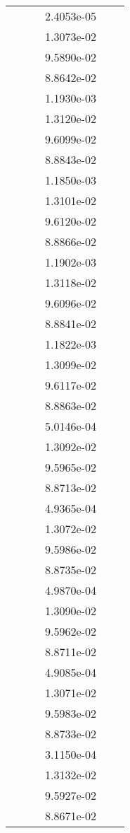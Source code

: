 \begin{xltabular}{\textwidth}{r|rS[table-format=1.3e+2]S[table-format=1.4e+2]S[table-format=1.4e+2]S[table-format=-1.5]}
&  &  & 2.4053e-05 & & \\
&  &  & 1.3073e-02 & & \\
&  &  & 9.5890e-02 & & \\
&  &  & 8.8642e-02 & & \\
&  &  & 1.1930e-03 & & \\
&  &  & 1.3120e-02 & & \\
&  &  & 9.6099e-02 & & \\
&  &  & 8.8843e-02 & & \\
&  &  & 1.1850e-03 & & \\
&  &  & 1.3101e-02 & & \\
&  &  & 9.6120e-02 & & \\
&  &  & 8.8866e-02 & & \\
&  &  & 1.1902e-03 & & \\
&  &  & 1.3118e-02 & & \\
&  &  & 9.6096e-02 & & \\
&  &  & 8.8841e-02 & & \\
&  &  & 1.1822e-03 & & \\
&  &  & 1.3099e-02 & & \\
&  &  & 9.6117e-02 & & \\
&  &  & 8.8863e-02 & & \\
&  &  & 5.0146e-04 & & \\
&  &  & 1.3092e-02 & & \\
&  &  & 9.5965e-02 & & \\
&  &  & 8.8713e-02 & & \\
&  &  & 4.9365e-04 & & \\
&  &  & 1.3072e-02 & & \\
&  &  & 9.5986e-02 & & \\
&  &  & 8.8735e-02 & & \\
&  &  & 4.9870e-04 & & \\
&  &  & 1.3090e-02 & & \\
&  &  & 9.5962e-02 & & \\
&  &  & 8.8711e-02 & & \\
&  &  & 4.9085e-04 & & \\
&  &  & 1.3071e-02 & & \\
&  &  & 9.5983e-02 & & \\
&  &  & 8.8733e-02 & & \\
&  &  & 3.1150e-04 & & \\
&  &  & 1.3132e-02 & & \\
&  &  & 9.5927e-02 & & \\
&  &  & 8.8671e-02 & & \\

\end{xltabular}
